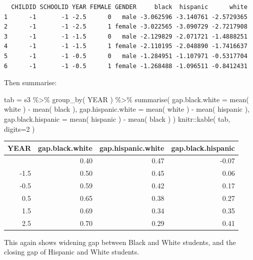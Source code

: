 \documentclass[
  letterpaper,
  DIV=11,
  numbers=noendperiod]{scrreprt}
\newenvironment{Shaded}{}{}
\newcommand{\AttributeTok}[1]{\textcolor[rgb]{0.49,0.56,0.16}{#1}}
\newcommand{\DecValTok}[1]{\textcolor[rgb]{0.25,0.63,0.44}{#1}}
\newcommand{\FunctionTok}[1]{\textcolor[rgb]{0.02,0.16,0.49}{#1}}
\newcommand{\NormalTok}[1]{#1}
\newcommand{\OtherTok}[1]{\textcolor[rgb]{0.00,0.44,0.13}{#1}}
\newcommand{\SpecialCharTok}[1]{\textcolor[rgb]{0.25,0.44,0.63}{#1}}
\begin{document}
\begin{verbatim}
  CHILDID SCHOOLID YEAR FEMALE GENDER     black  hispanic      white
1      -1       -1 -2.5      0   male -3.062596 -3.140761 -2.5729365
2      -1       -1 -2.5      1 female -3.022565 -3.090729 -2.7217908
3      -1       -1 -1.5      0   male -2.129829 -2.071721 -1.4888251
4      -1       -1 -1.5      1 female -2.110195 -2.048890 -1.7416637
5      -1       -1 -0.5      0   male -1.284951 -1.107971 -0.5317704
6      -1       -1 -0.5      1 female -1.268488 -1.096511 -0.8412431
\end{verbatim}

Then summarise:

\begin{Shaded}
\begin{Highlighting}[]
\NormalTok{tab }\OtherTok{=}\NormalTok{ s3 }\SpecialCharTok{\%\textgreater{}\%} \FunctionTok{group\_by}\NormalTok{( YEAR ) }\SpecialCharTok{\%\textgreater{}\%} 
  \FunctionTok{summarise}\NormalTok{( }\AttributeTok{gap.black.white =} \FunctionTok{mean}\NormalTok{( white ) }\SpecialCharTok{{-}} \FunctionTok{mean}\NormalTok{( black ),}
             \AttributeTok{gap.hispanic.white =} \FunctionTok{mean}\NormalTok{( white ) }\SpecialCharTok{{-}} \FunctionTok{mean}\NormalTok{( hispanic ),}
             \AttributeTok{gap.black.hispanic =} \FunctionTok{mean}\NormalTok{( hispanic ) }\SpecialCharTok{{-}} \FunctionTok{mean}\NormalTok{( black ) )}
\NormalTok{knitr}\SpecialCharTok{::}\FunctionTok{kable}\NormalTok{( tab, }\AttributeTok{digits=}\DecValTok{2}\NormalTok{ )}
\end{Highlighting}
\end{Shaded}

\begin{longtable}[]{@{}rrrr@{}}
\toprule\noalign{}
YEAR & gap.black.white & gap.hispanic.white & gap.black.hispanic \\
\midrule\noalign{}
\endhead
\bottomrule\noalign{}
\endlastfoot
-2.5 & 0.40 & 0.47 & -0.07 \\
-1.5 & 0.50 & 0.45 & 0.06 \\
-0.5 & 0.59 & 0.42 & 0.17 \\
0.5 & 0.65 & 0.38 & 0.27 \\
1.5 & 0.69 & 0.34 & 0.35 \\
2.5 & 0.70 & 0.29 & 0.41 \\
\end{longtable}

This again shows widening gap between Black and White students, and the
closing gap of Hispanic and White students.
\end{document}
